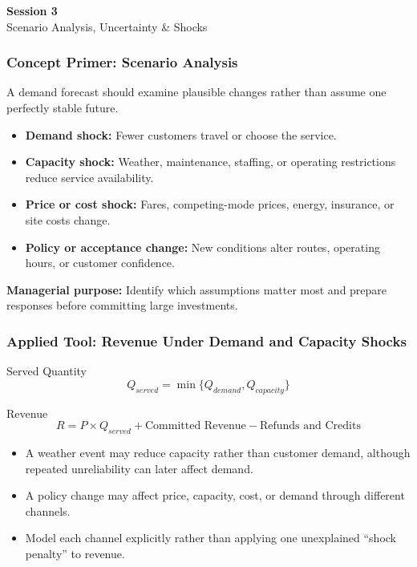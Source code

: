 \documentclass{beamer}
\begin{document}
\begin{frame}[c]
  \begin{center}
    \huge\color{cuhkpurple}\textbf{Session 3}\\
    \vspace{0.5cm}
    \Large Scenario Analysis, Uncertainty \& Shocks
  \end{center}
\end{frame}

\begin{frame}[t]
\frametitle{Concept Primer: Scenario Analysis}
A demand forecast should examine plausible changes rather than assume one perfectly stable future.
\begin{itemize}
\item \textbf{Demand shock:} Fewer customers travel or choose the service.
\item \textbf{Capacity shock:} Weather, maintenance, staffing, or operating restrictions reduce service availability.
\item \textbf{Price or cost shock:} Fares, competing-mode prices, energy, insurance, or site costs change.
\item \textbf{Policy or acceptance change:} New conditions alter routes, operating hours, or customer confidence.
\end{itemize}
\textbf{Managerial purpose:} Identify which assumptions matter most and prepare responses before committing large investments.
\end{frame}

\begin{frame}[t]
\frametitle{Applied Tool: Revenue Under Demand and Capacity Shocks}
\begin{block}{Served Quantity}
\[
Q_{served}=\min\{Q_{demand},Q_{capacity}\}
\]
\end{block}
\begin{block}{Revenue}
\[
R=P\times Q_{served}+\text{Committed Revenue}-\text{Refunds and Credits}
\]
\end{block}
\begin{itemize}
\item A weather event may reduce capacity rather than customer demand, although repeated unreliability can later affect demand.
\item A policy change may affect price, capacity, cost, or demand through different channels.
\item Model each channel explicitly rather than applying one unexplained ``shock penalty'' to revenue.
\end{itemize}
\end{frame}
\end{document}
